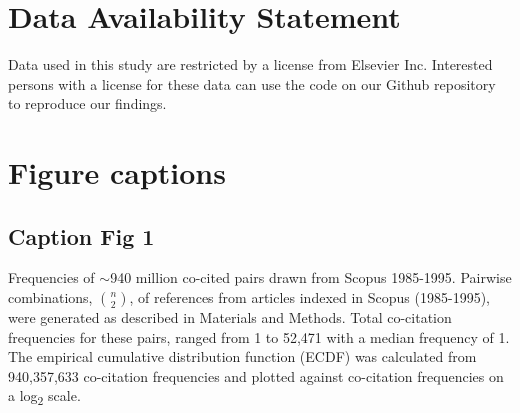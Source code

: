 \documentclass[utf8]{frontiersSCNS}
\begin{document}

\section*{Data Availability Statement}
Data used in this study are restricted by a license from Elsevier Inc. Interested persons with a license for these data can use the code on our Github repository~\citep{Korobskiy2019} to reproduce our findings. 

 


\section*{Figure captions}

\subsection{Caption Fig 1} Frequencies of $\sim$940 million co-cited pairs drawn from Scopus 1985-1995. Pairwise combinations, $n\choose 2$, of references from articles indexed in Scopus (1985-1995), were generated as described in Materials and Methods. Total co-citation frequencies for these pairs, ranged from 1 to 52,471 with a median frequency of 1. The empirical cumulative distribution function (ECDF) was calculated from 940,357,633 co-citation frequencies and plotted against co-citation frequencies on a log\textsubscript{2} scale.

\vspace{3mm}
\end{document}
